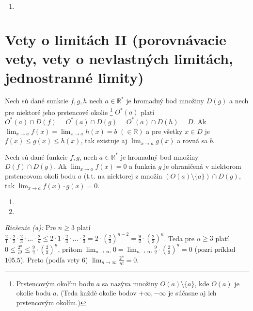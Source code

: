 \begin{enumerate}[resume]
  \item {}
\end{enumerate}

\section{Vety o limitách II (porovnávacie vety, vety o nevlastných limitách, jednostranné limity)}

\begin{veta}
Nech sú dané sunkcie $f,g,h$ nech $a \in \mathbb{R^*}$ je hromadný bod množiny $D(g)$ a nech pre niektoré jeho prstencové okolie \footnote{Prstencovým okolím bodu $a$ sa nazýva množiny $O(a) \setminus \{ a\}$, kde $O(a)$ je okolie bodu $a$. (Teda každé okolie bodov $+\infty,-\infty$ je súčasne aj ich prstencovým okolím.)} $O^*(a)$ platí $O^*(a) \cap D(f)=O^*(a)\cap D(g)=O^*(a) \cap D(h)=D$. Ak $\lim_{x \rightarrow a} f(x)=\lim_{x \rightarrow a} h(x)=b$  $( \in \mathbb{R})$ a pre všetky $x \in D$ je $f(x) \leq g(x) \leq h(x)$, tak existuje aj $\lim_{x \rightarrow a} g(x)$ a rovná sa $b$.
\end{veta}

\begin{veta}
Nech sú dané funkcie $f,g$, nech $a \in \mathbb{R^*}$ je hromadný bod množiny $D(f) \cap D(g)$. Ak $\lim_{x \rightarrow a} f(x)=0$ a funkcia $g$ je ohraničená v niektorom prstencovom okolí bodu $a$ (t.t. na niektorej z množín $(O(a) \setminus \{ a\})\cap D(g)$, tak $\lim_{x \rightarrow a} f(x) \cdot g(x)=0$.
\end{veta}

\begin{enumerate}[resume]
  \item {}
  \item {}
\end{enumerate}

\textit{Riešenie (a):}
Pre $n \geq 3$ platí $\frac{2}{1}\cdot \frac{2}{2}\cdot \frac{2}{3}\cdot ... \cdot \frac{2}{n} \leq 2 \cdot 1 \cdot \frac{2}{3} \cdot ... \cdot \frac{2}{3}=2 \cdot (\frac{2}{3})^{n-2}=\frac{9}{2} \cdot (\frac{2}{3})^n$. Teda pre $n \geq 3$ platí $0 \leq \frac{2^n}{n!}\leq \frac{9}{2}\cdot (\frac{2}{3})^n$, pritom $\lim_{n \rightarrow \infty} 0=\lim_{n \rightarrow \infty} \frac{9}{2} \cdot (\frac{2}{3})^n=0$ (pozri príklad $105.5$). Preto (podľa vety $6$) $\lim_{n \rightarrow \infty} \frac{2^n}{n!}=0$.

